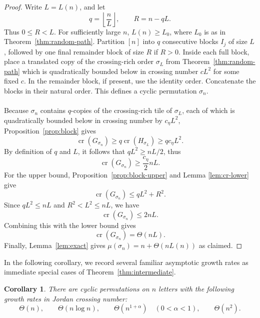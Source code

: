 \documentclass[11pt,a4paper]{amsart}
\newtheorem{corollary}[theorem]{Corollary}
\theoremstyle{definition}
\theoremstyle{remark}
\DeclareMathOperator{\crn}{cr}
\begin{document}
\begin{proof}
Write $L=L(n)$, and let
\begin{equation*}
        q=\left\lfloor \frac{n}{L}\right\rfloor,
        \qquad
        R=n-qL.
\end{equation*}
Thus $0\le R<L$.  For sufficiently large $n$, $L(n) \ge L_0$, where $L_0$ is as in Theorem~\ref{thm:random-path}.  Partition $[n]$ into
$q$ consecutive blocks $I_{j}$ of size $L$, followed by one final remainder block of size $R$ if $R>0$.  Inside each full block, place a translated copy of the crossing-rich order $\sigma_L$ from Theorem~\ref{thm:random-path} which is quadratically bounded below in crossing number $cL^{2}$ for some fixed $c$.  In the remainder block, if present, use the identity order.  Concatenate the blocks in their natural order.  This defines a cyclic permutation $\sigma_n$.   \\
\\
Because $\sigma_{n}$ contains $q$-copies of the crossing-rich tile of $\sigma_{L}$, each of which is quadratically bounded below in crossing number by $c_{\eta}L^{2}$, Proposition~\ref{prop:block} gives
\begin{equation*}
        \crn(G_{\sigma_{n}})\ge q\crn(H_{\sigma_{L}}) \geq qc_{\eta}L^2.
\end{equation*}
By definition of $q$ and $L$, it follows that $qL^{2} \geq nL/2$, thus 
\begin{equation*}
        \crn(G_{\sigma_{n}}) \ge \frac{c_{\eta}}{2} nL.
\end{equation*}
For the upper bound, Proposition~\ref{prop:block-upper} and Lemma \ref{lem:cr-lower} give
\begin{equation*}
        \crn(G_{\sigma_{n}}) \le qL^2+R^2.
\end{equation*}
Since $qL^2\le nL$ and $R^2<L^2\le nL$, we have
\begin{equation*}
        \crn(G_{\sigma_{n}}) \le 2nL.
\end{equation*}
Combining this with the lower bound gives
\begin{equation*}
        \crn(G_{\sigma_{n}}) =\Theta(nL).
\end{equation*}
Finally, Lemma~\ref{lem:exact} gives $\mu(\sigma_n)=n+\Theta(nL(n))$ as claimed.
\end{proof}

In the following corollary, we record several familiar asymptotic growth rates as immediate special cases of Theorem~\ref{thm:intermediate}.

\begin{corollary}\label{cor:natural-families}
There are cyclic permutations on $n$ letters with the following growth rates in Jordan crossing number:
\begin{equation*}
        \Theta(n),\qquad
        \Theta(n\log n),\qquad
        \Theta(n^{1+\alpha})\quad(0<\alpha<1),\qquad
        \Theta(n^2).
\end{equation*}
\end{corollary}
\end{document}
